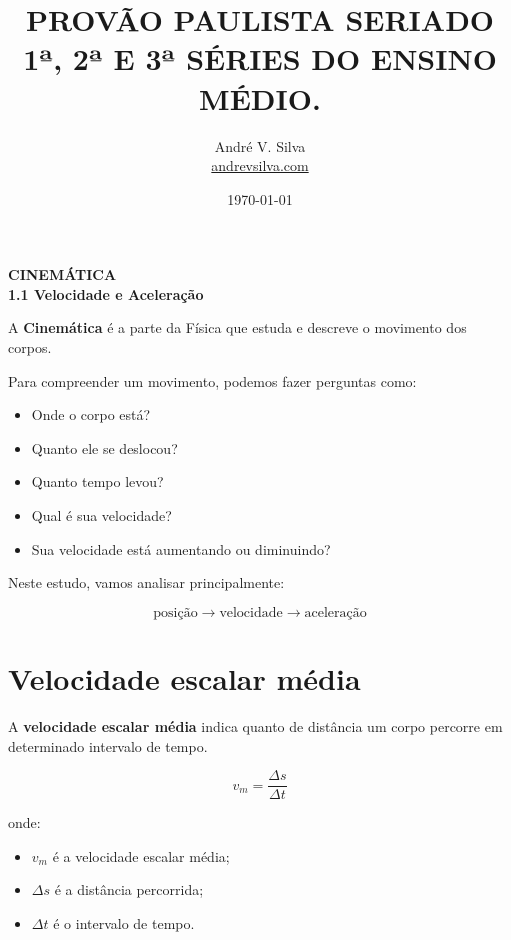\documentclass[a4paper,12pt]{article}
\title{
    \textbf{\large
    PROVÃO PAULISTA SERIADO 1ª, 2ª E 3ª SÉRIES DO ENSINO MÉDIO.}
}
\author{Andr\'e V. Silva \\ \href{https://andrevsilva.com/}{andrevsilva.com}}
\date{\today}
\begin{document}
\maketitle

\begin{center}
    \textbf{\Large CINEMÁTICA}\\[0.2cm]
    \textbf{\large 1.1 Velocidade e Aceleração}
\end{center}

\tableofcontents

\vspace{0.5cm}

\begin{ideia}

A \textbf{Cinemática} é a parte da Física que estuda e descreve
o movimento dos corpos.

Para compreender um movimento, podemos fazer perguntas como:

\begin{itemize}
    \item Onde o corpo está?
    \item Quanto ele se deslocou?
    \item Quanto tempo levou?
    \item Qual é sua velocidade?
    \item Sua velocidade está aumentando ou diminuindo?
\end{itemize}

Neste estudo, vamos analisar principalmente:

\[
\boxed{
\text{posição}
\longrightarrow
\text{velocidade}
\longrightarrow
\text{aceleração}
}
\]

\end{ideia}


\section{Velocidade escalar média}

\begin{ideia}

A \textbf{velocidade escalar média} indica quanto de distância
um corpo percorre em determinado intervalo de tempo.

\[
\boxed{
v_m=\frac{\Delta s}{\Delta t}
}
\]

onde:

\begin{itemize}
    \item $v_m$ é a velocidade escalar média;
    \item $\Delta s$ é a distância percorrida;
    \item $\Delta t$ é o intervalo de tempo.
\end{itemize}

\end{ideia}
\end{document}
